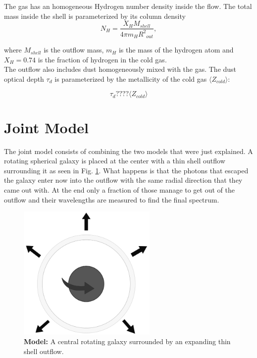 The gas has an homogeneous Hydrogen number density inside the flow. The total mass inside the shell is parameterized by its column density\\

\begin{equation}
	\label{eq:nh}
	N_H = \frac{X_H M_{shell}}{4\pi m_H {R^2}_{out}},
\end{equation}

where $M_{shell}$ is the outflow mass, $m_H$ is the mass of the hydrogen atom and $X_H=0.74$ is the fraction of hydrogen in the cold gas.\\

The outflow also includes dust homogeneously mixed with the gas. The dust optical depth $\tau_d$ is parameterized by the metallicity of the cold gas $\langle Z_{cold} \rangle$: 

\begin{equation}
	\label{eq:z}
	\tau_{d} ???? \langle Z_{cold} \rangle
\end{equation}

\section{Joint Model}

The joint model consists of combining the two models that were just explained. A rotating spherical galaxy is placed at the center with a thin shell outflow surrounding it as seen in Fig. \ref{fig:model_app}. What happens is that the photons that escaped the galaxy enter now into the outflow with the same radial direction that they came out with. At the end only a fraction of those manage to get out of the outflow and their wavelengths are measured to find the final spectrum. \\

\begin{figure}[h!]
	\begin{center}
		\includegraphics[width=0.6\textwidth]{./figures/appendix/model.png}
	\end{center}
	\caption{\textbf{Model:} A central rotating galaxy surrounded by an expanding thin shell outflow.}
	\label{fig:model_app}
\end{figure}

